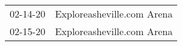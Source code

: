 \begin{supertabular}{p{0.25\columnwidth}p{0.75\columnwidth}}
 02-14-20 &  Exploreasheville.com Arena \\
 02-15-20 &  Exploreasheville.com Arena \\
\end{supertabular}
